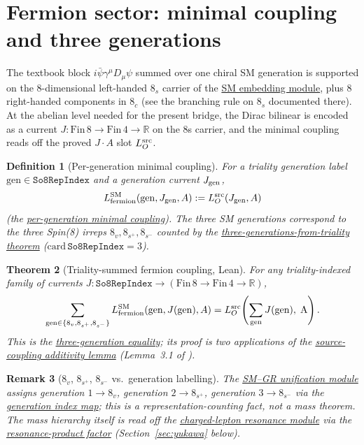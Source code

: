 \documentclass[11pt]{amsart}
\newtheorem{theorem}{Theorem}[section]
\newtheorem{definition}[theorem]{Definition}
\newtheorem{remark}[theorem]{Remark}
\begin{document}
\section{Fermion sector: minimal coupling and three generations}
\label{sec:fermion}

The textbook block $i\bar\psi\gamma^\mu D_\mu\psi$ summed over one chiral
SM generation is supported on the 8-dimensional left-handed $8_s$ carrier of
the \hyperref[lean:sm-embedding]{SM embedding module}, plus 8 right-handed
components in $8_c$ (see the branching rule on $8_s$ documented there).
At the abelian level needed for the present bridge, the Dirac bilinear is
encoded as a current $J:\mathrm{Fin}\,8\to\mathrm{Fin}\,4\to\mathbb{R}$ on
the 8s carrier, and the minimal coupling reads off the proved $J\cdot A$ slot
$L_O^{\rm src}$.

\begin{definition}[Per-generation minimal coupling]
\label{def:fermion-coupling}
For a triality generation label $\mathrm{gen}\in\texttt{So8RepIndex}$ and a
generation current $J_{\rm gen}$,
\[
L_{\rm fermion}^{\rm SM}(\mathrm{gen}, J_{\rm gen}, A) := L_O^{\rm src}(J_{\rm gen},A)
\]
(the \hyperref[lean:fermion-minimal]{per-generation minimal coupling}).
The three SM generations correspond to the three Spin(8) irreps
$8_v, 8_{s^+}, 8_{s^-}$ counted by the
\hyperref[lean:three-gen-reps]{three-generations-from-triality theorem}
($\mathrm{card}\,\texttt{So8RepIndex}=3$).
\end{definition}

\begin{theorem}[Triality-summed fermion coupling, Lean]
\label{thm:three-generations}
For any triality-indexed family of currents $J:\texttt{So8RepIndex}\to(\mathrm{Fin}\,8\to\mathrm{Fin}\,4\to\mathbb{R})$,
\[
\sum_{\mathrm{gen}\in\{8_v,8_{s^+},8_{s^-}\}} L_{\rm fermion}^{\rm SM}(\mathrm{gen},J(\mathrm{gen}),A)
= L_O^{\rm src}\!\left(\sum_{\rm gen} J(\rm gen),\;A\right).
\]
This is the \hyperref[lean:three-gen]{three-generation equality}; its proof
is two applications of the
\hyperref[lean:J-add]{source-coupling additivity lemma}
(Lemma~3.1 of \cite{hqiv-oct-action-paper}).
\end{theorem}

\begin{remark}[$8_v$, $8_{s^+}$, $8_{s^-}$ vs.\ generation labelling]
The \hyperref[lean:sm-gr]{SM--GR unification module} assigns generation
$1\to 8_v$, generation $2\to 8_{s^+}$, generation $3\to 8_{s^-}$ via the
\hyperref[lean:sm-gen-index]{generation index map}; this is a
representation-counting fact, not a mass theorem. The mass hierarchy itself
is read off the \hyperref[lean:lepton-resonance]{charged-lepton resonance
module} via the \hyperref[lean:resonance-product]{resonance-product factor}
(Section~\ref{sec:yukawa} below).
\end{remark}
\end{document}
